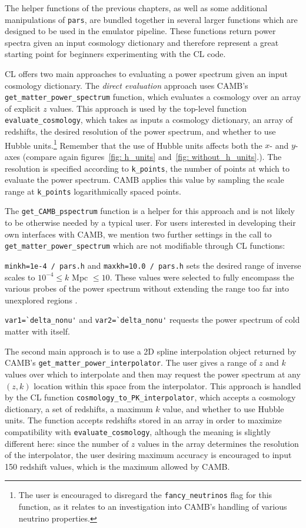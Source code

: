 
The helper functions of the previous chapters, as well as some additional
manipulations of \verb|pars|, are bundled together in several larger
functions which are designed to be used in the emulator pipeline. These
functions return power spectra given an input cosmology dictionary and
therefore represent a great starting point for beginners experimenting with
the CL code.

CL offers two main approaches to evaluating a power spectrum given an input
cosmology dictionary. The \textit{direct evaluation} approach uses CAMB's 
\verb|get_matter_power_spectrum| function, which evaluates a cosmology over
an array of explicit $z$ values. This approach is used by the top-level
function \verb|evaluate_cosmology|, which takes as inputs a 
cosmology dictionary, an array of redshifts, the desired resolution of the
power spectrum, and whether to use Hubble
units.\footnote{The user is encouraged to disregard the
\verb|fancy_neutrinos| flag for this function, as it relates
to an investigation into CAMB's handling of various neutrino properties.}
Remember that the use of Hubble units affects both the $x$- and
$y$-axes (compare again figures~\ref{fig: h_units}
and~\ref{fig: without_h_units}.). The resolution is specified according to
\verb|k_points|, the number of points at which to evaluate
the power spectrum. CAMB applies this value by sampling the scale range at
\verb|k_points| logarithmically spaced points.

The \verb|get_CAMB_pspectrum| 
function is a helper for this approach and is not likely to be otherwise 
needed by a typical user. For users interested in
developing their own interfaces with CAMB, we mention two further
settings in the call to \verb|get_matter_power_spectrum| which are not
modifiable through CL functions:

\verb|minkh=1e-4 / pars.h| and \verb|maxkh=10.0 / pars.h|
\quad sets the desired
range of inverse scales to $10^{-4} \leq k$ Mpc $\leq 10$. These values were
selected to fully encompass the various probes of the power spectrum without
extending the range too far into unexplored regions . 

\verb|var1=`delta_nonu'| and \verb|var2=`delta_nonu'| requests the power
spectrum of cold matter with itself.

The second main approach is to use a 2D spline interpolation object returned
by CAMB's \verb|get_matter_power_interpolator|. The user gives a
range of $z$ and $k$ values over which to interpolate and then may request
the power spectrum at any $(z, k)$ location within this space from the
interpolator. This approach is handled by the CL function
\verb|cosmology_to_PK_interpolator|, which accepts a cosmology dictionary,
a set of redshifts, a maximum $k$ value, and whether to use Hubble units.
The function accepts redshifts stored in an array in order to maximize
compatibility with \verb|evaluate_cosmology|, although the meaning is slightly
different here: since the number of $z$ values in the array determines the
resolution of the interpolator, the user desiring maximum accuracy is
encouraged to input 150 redshift values, which is the maximum allowed by CAMB.

